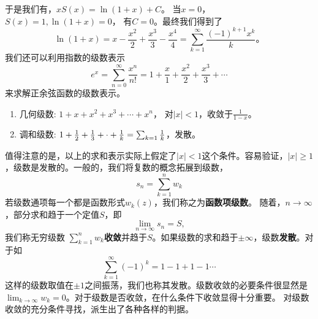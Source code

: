 于是我们有，$
    x S(x) = \ln (1 + x) + C \textrm{。}$
当$x=0$， $S(x) = 1, \ln (1+x) = 0$， 有$C=0$。最终我们得到了
\begin{equation}
    \ln (1+x) = x -  \frac{x^2}{2} + \frac{x^3}{3} - \frac{x^4}{4} = \sum_{k=1}^{\infty} \frac{(-1)^{k+1} x^k}{k} \textrm{。}
\end{equation}
我们还可以利用指数的级数表示
\begin{equation}
    e^{x} = \sum_{n=0}^{\infty} \frac{x^n}{n!} = 1 + \frac{x}{1} + \frac{x^2}{2} + \frac{x^3}{3} + \cdots 
\end{equation}
来求解正余弦函数的级数表示。
\begin{enumerate}
    \item 几何级数: $ 1 + x + x^2 + x^3 + \cdots + x^n$， 对$|x|<1$，收敛于$\frac{1}{1-x}$。
    \item 调和级数: $ 1 + \frac{1}{2} + \frac{1}{3} + \cdot +\frac{1}{k} = \sum_{k=1} \frac{1}{k}$，发散。
\end{enumerate}

值得注意的是，以上的求和表示实际上假定了$|x|<1$这个条件。容易验证，$|x|\geq 1$，级数是发散的。一般的，我们将复数的概念拓展到级数，
\begin{equation}
    s_n = \sum_{k=1}^{n} w_{k}
\end{equation}
若级数通项每一个都是函数形式$w_k(z)$，我们称之为\textbf{函数项级数}。
随着，$n\to \infty$，部分求和趋于一个定值$S$，即
\begin{equation}
    \lim_{n\to \infty} s_n = S ,
\end{equation}
我们称无穷级数 $\sum_{k=1}^{n} w_{k}${\bf 收敛}并趋于$S$。如果级数的求和趋于$\pm \infty$，级数{\bf 发散}。对于如
\begin{equation}
    \sum_{k=1}^{\infty} (-1)^k = 1 - 1 + 1 - 1 \cdots 
\end{equation}
这样的级数取值在$\pm 1$之间振荡，我们也称其发散。级数收敛的必要条件很显然是$\lim_{k\to \infty} w_k = 0$。对于级数是否收敛，在什么条件下收敛显得十分重要。
对级数收敛的充分条件寻找，派生出了各种各样的判据。



